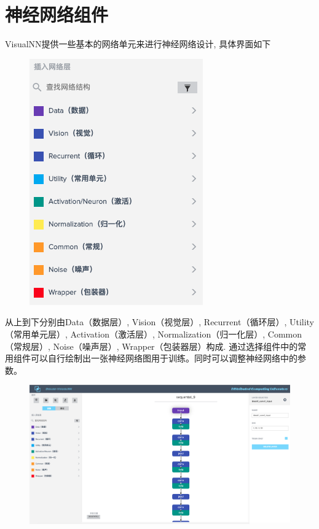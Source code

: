 \documentclass{progbookcn}
\begin{document}
\section{神经网络组件}

VisualNN提供一些基本的网络单元来进行神经网络设计, 具体界面如下

\begin{figure}[H]
  \centering
  \includegraphics[scale = 0.6]{network_unit.png}
\end{figure}

从上到下分别由Data（数据层）, Vision（视觉层）, Recurrent（循环层）, Utility（常用单元层）, Activation（激活层）, Normalization（归一化层）, Common（常规层）, Noise（噪声层）,  Wrapper（包装器层）构成. 通过选择组件中的常用组件可以自行绘制出一张神经网络图用于训练。同时可以调整神经网络中的参数。

\begin{figure}[H]
  \centering
  \includegraphics[width=0.98\linewidth]{draw.png}
\end{figure}
\end{document}
